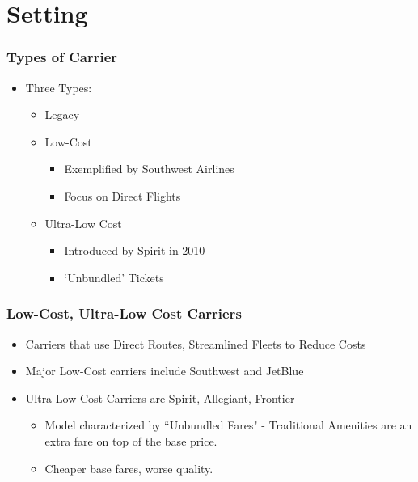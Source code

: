 \documentclass[xcolor=dvipsnames]{beamer}
\begin{document}
    \section{Setting}
	\begin{frame}
		\frametitle{Types of Carrier}
		\begin{itemize}
			\item Three Types:
			\begin{itemize}
				\item Legacy %
				\item Low-Cost 
				\begin{itemize}
					\item Exemplified by Southwest Airlines
					\item Focus on Direct Flights
				\end{itemize}
				\item Ultra-Low Cost
				\begin{itemize}
					\item Introduced by Spirit in 2010
					\item `Unbundled' Tickets
				\end{itemize}
			\end{itemize}
		\end{itemize}
	\end{frame}
	
	\begin{frame}
		\frametitle{Low-Cost, Ultra-Low Cost Carriers}
		\begin{itemize}
            \item Carriers that use Direct Routes, Streamlined Fleets to Reduce Costs
			\item Major Low-Cost carriers include Southwest and JetBlue
            \item Ultra-Low Cost Carriers are Spirit, Allegiant, Frontier
            \begin{itemize}
                \item Model characterized by ``Unbundled Fares" - Traditional Amenities are an extra fare on top of the base price.
                \item Cheaper base fares, worse quality.
            \end{itemize}
		\end{itemize}
	\end{frame}
\end{document}
